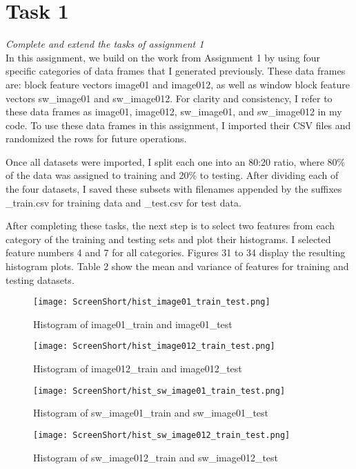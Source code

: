 \documentclass[conference,12pt]{IEEEtran}
\begin{document}
\section{Task 1}
\textit{Complete and extend the tasks of assignment 1}\\
In this assignment, we build on the work from Assignment 1 by using four specific categories of data frames that I generated previously. These data frames are: block feature vectors image01 and image012, as well as window block feature vectors sw\_image01 and sw\_image012. For clarity and consistency, I refer to these data frames as image01, image012, sw\_image01, and sw\_image012 in my code. To use these data frames in this assignment, I imported their CSV files and randomized the rows for future operations.

Once all datasets were imported, I split each one into an 80:20 ratio, where 80\% of the data was assigned to training and 20\% to testing. After dividing each of the four datasets, I saved these subsets with filenames appended by the suffixes \_train.csv for training data and \_test.csv for test data.

After completing these tasks, the next step is to select two features from each category of the training and testing sets and plot their histograms. I selected feature numbers 4 and 7 for all categories. Figures 31 to 34 display the resulting histogram plots. Table 2 show the mean and variance of features for training and testing datasets.


\begin{figure}[h!]
    \centering
    \texttt{[image: ScreenShort/hist\_image01\_train\_test.png]}
    \caption{Histogram of image01\_train and image01\_test}
\end{figure}

\begin{figure}[h!]
    \centering
    \texttt{[image: ScreenShort/hist\_image012\_train\_test.png]}
    \caption{Histogram of image012\_train and image012\_test}
\end{figure}

\begin{figure}[h!]
    \centering
    \texttt{[image: ScreenShort/hist\_sw\_image01\_train\_test.png]}
    \caption{Histogram of sw\_image01\_train and sw\_image01\_test}
\end{figure}

\begin{figure}[h!]
    \centering
    \texttt{[image: ScreenShort/hist\_sw\_image012\_train\_test.png]}
    \caption{Histogram of sw\_image012\_train and sw\_image012\_test}
\end{figure}
\end{document}
